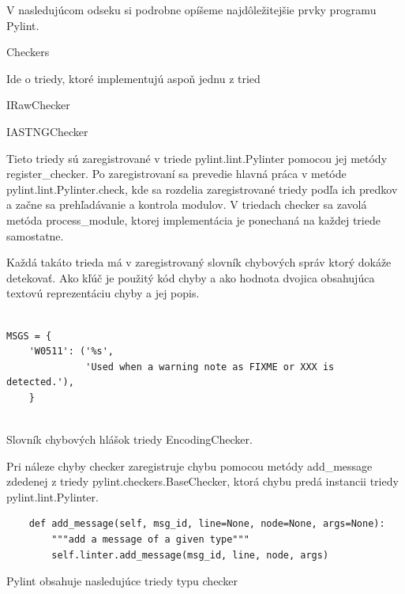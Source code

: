 \documentclass[11pt,oneside,final]{fithesis2}
\begin{document}
		V nasledujúcom odseku si podrobne opíšeme najdôležitejšie prvky programu Pylint.
		
    \begin{list}{•}{}
		\item Checkers 
		
		Ide o triedy, ktoré implementujú aspoň jednu z tried
		
			    \begin{list}{•}{}
					\item IRawChecker
					\item IASTNGChecker
    			\end{list}		
		
		Tieto triedy sú zaregistrované v triede pylint.lint.Pylinter pomocou jej metódy register\_checker.	Po zaregistrovaní sa prevedie hlavná práca v metóde pylint.lint.Pylinter.check, kde sa rozdelia zaregistrované triedy podľa ich predkov a začne sa prehľadávanie a kontrola modulov. V triedach checker sa zavolá metóda process\_module, ktorej implementácia je ponechaná na každej triede samostatne.
		
		Každá takáto trieda má v zaregistrovaný slovník chybových správ ktorý dokáže detekovať. Ako kľúč je použitý kód chyby a ako hodnota dvojica obsahujúca textovú reprezentáciu chyby a jej popis.

\begin{lstlisting}

MSGS = {
    'W0511': ('%s',
              'Used when a warning note as FIXME or XXX is detected.'),
    }
		
\end{lstlisting}		

Slovník chybových hlášok triedy EncodingChecker.


Pri náleze chyby checker zaregistruje chybu pomocou metódy add\_message zdedenej z triedy pylint.checkers.BaseChecker, ktorá chybu predá instancii triedy pylint.lint.Pylinter.

\begin{lstlisting}
    def add_message(self, msg_id, line=None, node=None, args=None):
        """add a message of a given type"""
        self.linter.add_message(msg_id, line, node, args)
\end{lstlisting}

		Pylint obsahuje nasledujúce triedy typu checker
		

\end{list}
\end{document}
